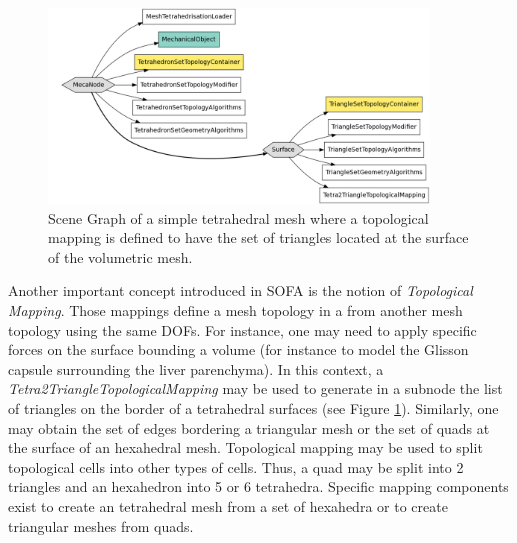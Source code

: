 \begin{figure}[ht]
    \centering
        \includegraphics[width=0.9\textwidth]{topologyGraph.pdf}
       \caption{Scene Graph of a simple tetrahedral mesh where a topological mapping is defined to have the set of triangles located at the surface of the volumetric mesh.}
    \label{graphExample}
\end{figure}


Another important concept introduced in SOFA is the notion of \textit{Topological Mapping}. Those mappings  define a mesh topology in a from another mesh topology using the same DOFs.  For instance, one may need to apply specific forces on the surface bounding a volume (for instance to model the Glisson capsule surrounding the liver parenchyma). In this context, a \textit{Tetra2TriangleTopologicalMapping} may be used  to generate in a subnode the list of triangles on the border of a tetrahedral surfaces (see Figure \ref{graphExample}). Similarly, one may obtain the set of edges bordering a triangular mesh or the set of quads at the surface of an hexahedral mesh. Topological mapping may be used to split topological cells into other types of cells. Thus, a quad may be split into 2 triangles and an hexahedron into 5 or 6 tetrahedra. Specific mapping components exist to create an tetrahedral mesh from a set of hexahedra or to create triangular meshes from quads.




